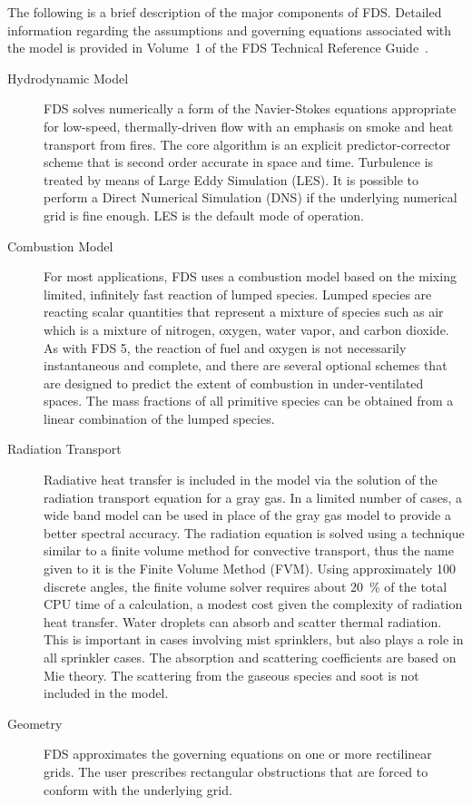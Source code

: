 \documentclass[11pt]{book}
\begin{document}
The following is a brief description of the major components of FDS. Detailed information regarding the assumptions and governing equations associated with the model is provided in Volume~1 of the FDS Technical Reference Guide~\cite{FDS_Tech_Guide}.
\begin{description}
\item[Hydrodynamic Model] FDS solves numerically a form of the Navier-Stokes equations appropriate for low-speed, thermally-driven flow with an emphasis on smoke and heat transport from fires. The core algorithm is an explicit predictor-corrector scheme that is second order accurate in space and time. Turbulence is treated by means of Large Eddy Simulation (LES). It is possible to perform a Direct Numerical Simulation (DNS) if the underlying numerical grid is fine enough. LES is the default mode of operation.
\item[Combustion Model] For most applications, FDS uses a combustion model based on the mixing limited, infinitely fast reaction of lumped species. Lumped species are reacting scalar quantities that represent a mixture of species such as air which is a mixture of nitrogen, oxygen, water vapor, and carbon dioxide. As with FDS 5, the reaction of fuel and oxygen is not necessarily instantaneous and complete, and there are several optional schemes that are designed to predict the extent of combustion in under-ventilated spaces. The mass fractions of all primitive species can be obtained from a linear combination of the lumped species.
\item[Radiation Transport] Radiative heat transfer is included in the model via the solution of the radiation transport equation for a gray gas. In a limited number of cases, a wide band model can be used in place of the gray gas model to provide a better spectral accuracy. The radiation equation is solved using a technique similar to a finite volume method for convective transport, thus the name given to it is the Finite Volume Method (FVM). Using approximately 100 discrete angles, the finite volume solver requires about 20~\% of the total CPU time of a calculation, a modest cost given the complexity of radiation heat transfer.  Water droplets can absorb and scatter thermal radiation. This is important in cases involving mist sprinklers, but also plays a role in all sprinkler cases. The absorption and scattering coefficients are based on Mie theory. The scattering from the gaseous species and soot is not included in the model.
\item[Geometry] FDS approximates the governing equations on one or more rectilinear grids. The user prescribes rectangular obstructions that are forced to conform with the underlying grid.

\end{description}
\end{document}
